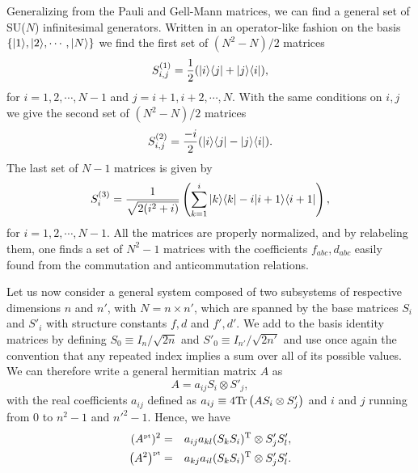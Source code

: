 Generalizing from the Pauli and Gell-Mann matrices, we can find a general set of SU($N$) infinitesimal generators. Written in an operator-like fashion on the basis $\{ | 1 \rangle, | 2 \rangle, \cdots, | N \rangle \}$ we find the first set of $(N^2-N)/2$ matrices
\[ S^{(1)}_{i,j} =\frac 1 2 ( | i \rangle \langle j | + | j \rangle \langle i | ) ,\]
for $i=1,2,\cdots, N-1$ and $j=i+1,i+2,\cdots, N$. With the same conditions on $i,j$ we give the second set of  $(N^2-N)/2$ matrices
\[ S^{(2)}_{i,j} =\frac{-i}2 ( | i \rangle \langle j | - | j \rangle \langle i | ).\]
The last set of $N-1$ matrices is given by
\[ S^{(3)}_{i} =\frac{1}{\sqrt{2(i^2+i)}} \left( \sum_{k=1}^i | k \rangle \langle k | - i | i+1 \rangle \langle i+1 | \right),\]
for $i=1,2,\cdots, N-1$. All the matrices are properly normalized, and by relabeling them, one finds a set of $N^2-1$ matrices with the coefficients $f_{abc}, d_{abc}$ easily found from the commutation and anticommutation relations.

Let us now consider a general system composed of two subsystems of respective dimensions $n$ and $n'$, with $N=n\times n'$, which are spanned by the base matrices $S_i$ and $S'_i$ with structure constants $f, d$ and $f', d'$. We add to the basis identity matrices by defining $S_0 \equiv I_n / \sqrt{2n}$ and $S'_0\equiv I_{n'}/ \sqrt{2n'}$ and use once again the convention that any repeated index implies a sum over all of its possible values. We can therefore write a general hermitian matrix $A$ as
\[ A = a_{ij} S_i \otimes S'_j, \]
with the real coefficients $a_{ij}$ defined as $a_{ij} \equiv 4 \mbox{\textup{Tr}}\left( A S_i \otimes S'_j \right)$ and $i$ and $j$ running from 0 to $n^2-1$ and ${n'}^2-1$. Hence, we have
\begin{eqnarray}
  (A^{\mbox{\tiny \textup{pt}}})^2 &=& a_{ij} a_{kl} (S_k S_i)^{\textrm{T}} \otimes S'_j S'_l, \label{eq-Apt2}\\
  \left(A^2 \right)^{\mbox{\tiny \textup{pt}}} &=& a_{kj} a_{il}  (S_k S_i)^{\textrm{T}}  \otimes S'_j S'_l. \label{eq-A2pt}
\end{eqnarray}

